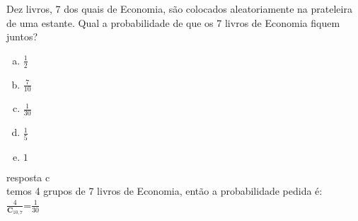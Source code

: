 \begin{ex}
 Dez livros, 7 dos quais de Economia, são colocados aleatoriamente na prateleira de uma estante. Qual a probabilidade de que os 7 livros de Economia fiquem juntos?
    \begin{enumerate}[(a)]
    \item $\frac{1}{2}$
    \item $\frac{7}{10}$
    \item $\frac{1}{30}$
    \item $\frac{1}{5}$
    \item $1$
    \end{enumerate}
    \begin{sol}
    resposta c \\
    temos 4 grupos de 7 livros de Economia, então a probabilidade pedida é:\\
    $\frac{4}{\textbf{C}_{{10},7}}$=$\frac{1}{30}$
    \end{sol}
\end{ex}